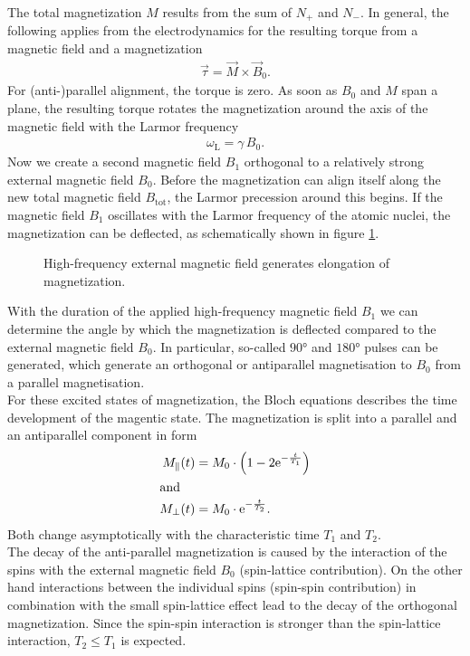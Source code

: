 The total magnetization $M$ results from the sum of $N_+$ and $N_-$.
In general, the following applies from the electrodynamics for the resulting torque from a magnetic field and a magnetization
\begin{align}
\vec{\tau}=\vec{M}\times\vec{B}_0.
\end{align}
For (anti-)parallel alignment, the torque is zero.
As soon as $B_0$ and $M$ span a plane, the resulting torque rotates the magnetization around the axis of the magnetic field with the Larmor frequency
\begin{align}
\omega_\text{L}=\gamma\,B_0.
\label{eq:lamor}
\end{align}
Now we create a second magnetic field $B_1$ orthogonal to a relatively strong external magnetic field $B_0$.
Before the magnetization can align itself along the new total magnetic field $B_\text{tot}$, the Larmor precession around this begins.
If the magnetic field $B_1$ oscillates with the Larmor frequency of the atomic nuclei, the magnetization can be deflected, as schematically shown in figure \ref{fig:magnet}.
\begin{figure}[ht]
\centering

\caption{High-frequency external magnetic field generates elongation of magnetization.}
\label{fig:magnet}
\end{figure}
With the duration of the applied high-frequency magnetic field $B_1$ we can determine the angle by which the magnetization is deflected compared to the external magnetic field $B_0$.
In particular, so-called $\ang{90}$ and $\ang{180}$ pulses can be generated, which generate an orthogonal or antiparallel magnetisation to $B_0$ from a parallel magnetisation.\\

For these excited states of magnetization, the Bloch equations describes the time development of the magentic state.
The magnetization is split into a parallel and an antiparallel component in form
\begin{align}
M_\parallel(t)&=M_0\cdot\left(1-2\mathrm{e}^{-\frac{t}{T_1}}\right) \label{eq:t1}\\
\intertext{and}
M_\bot(t)&=M_0\cdot\mathrm{e}^{-\frac{t}{T_2}}.
\label{eq:t2}
\end{align}
Both change asymptotically with the characteristic time $T_1$ and $T_2$.\\
The decay of the anti-parallel magnetization is caused by the interaction of the spins with the external magnetic field $B_0$ (spin-lattice contribution).
On the other hand interactions between the individual spins (spin-spin contribution) in combination with the small spin-lattice effect lead to the decay of the orthogonal magnetization.
Since the spin-spin interaction is stronger than the spin-lattice interaction, $T_2\leq T_1$ is expected.\\

